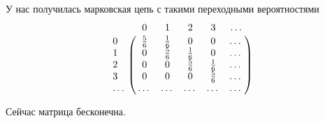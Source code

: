 \begin{enumerate}[label=\alph*)]
  У нас получилась марковская цепь с такими переходными вероятностями
  \begin{equation*}
    \bordermatrix{~ & 0 & 1 & 2 & 3 & \dotsc \cr
                  0 & \frac{5}{6} & \frac{1}{6} & 0 & 0 & \dotsc \cr
                  1 & 0 & \frac{5}{6} & \frac{1}{6} & 0 & \dotsc \cr
                  2 & 0 & 0 & \frac{5}{6} & \frac{1}{6} & \dotsc \cr
                  3 & 0 & 0 & 0 & \frac{5}{6} & \dotsc \cr
                  \dotsc & \dotsc & \dotsc & \dotsc & \dotsc & \dotsc \cr}
  \end{equation*}

  Сейчас матрица бесконечна.
\end{enumerate}
